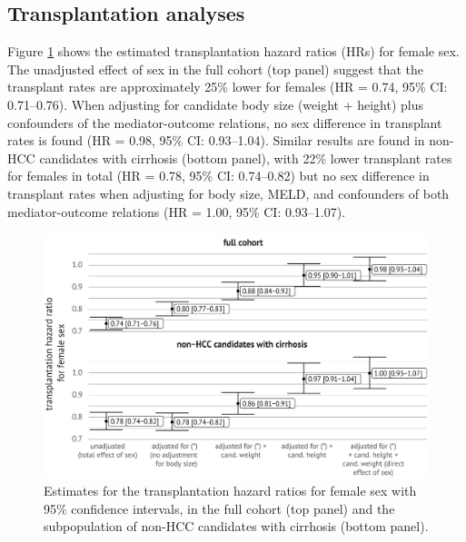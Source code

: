 \documentclass[11pt,twoside,]{book}
\begin{document}
\endgroup
\newpage

\subsection{Transplantation analyses}\label{CHrsltsmediationtxp}

Figure \ref{fig:ch4fig4} shows the estimated transplantation hazard ratios (HRs)
for female sex. The unadjusted effect of sex in the full cohort (top panel) suggest that the
transplant rates are approximately 25\% lower for females
(HR = 0.74, 95\% CI: 0.71--0.76). When
adjusting for candidate body size (weight + height) plus confounders of the
mediator-outcome relations, no sex difference in transplant rates is
found (HR = 0.98, 95\% CI: 0.93--1.04). Similar results are found in non-HCC
candidates with cirrhosis (bottom panel), with 22\% lower transplant rates for females in total (HR = 0.78, 95\% CI: 0.74--0.82) but no sex
difference in transplant rates when adjusting for body size,
MELD, and confounders of both mediator-outcome relations (HR = 1.00, 95\% CI: 0.93--1.07).

\begin{figure}[ht]

{\centering \includegraphics[width=1\linewidth]{figures/ch4/fig4_hr_txp} 

}

\caption{Estimates for the transplantation hazard ratios for female sex with 95\% confidence intervals, in the full cohort (top panel) and the subpopulation of non-HCC candidates with cirrhosis (bottom panel).}\label{fig:ch4fig4}
\end{figure}

\newpage
\end{document}
